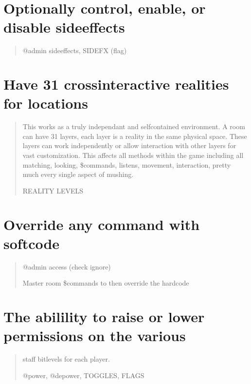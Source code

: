 \documentclass[letterpaper,10pt,english]{sphinxmanual}
\begin{document}
\section{Optionally control, enable, or disable sideeffects}
\label{\detokenize{features:optionally-control-enable-or-disable-sideeffects}}\begin{quote}

\sphinxAtStartPar
@admin sideeffects, SIDEFX (flag)
\end{quote}


\section{Have 31 cross\sphinxhyphen{}interactive realities for locations}
\label{\detokenize{features:have-31-cross-interactive-realities-for-locations}}\begin{quote}

\sphinxAtStartPar
This works as a truly independant and self\sphinxhyphen{}contained environment.
A room can have 31 \textquotesingle{}layers\textquotesingle{}, each \textquotesingle{}layer\textquotesingle{} is a reality in
the same physical space.  These layers can work independently
or allow interaction with other layers for vast customization.
This affects all methods within the game including all matching,
looking, \$commands, listens, movement, interaction, pretty
much every single aspect of mushing.

\sphinxAtStartPar
REALITY LEVELS
\end{quote}


\section{Override any command with softcode}
\label{\detokenize{features:override-any-command-with-softcode}}\begin{quote}

\sphinxAtStartPar
@admin access (check ignore)

\sphinxAtStartPar
Master room \$commands to then override the hardcode
\end{quote}


\section{The abilility to raise or lower permissions on the various}
\label{\detokenize{features:the-abilility-to-raise-or-lower-permissions-on-the-various}}\begin{quote}

\sphinxAtStartPar
staff bitlevels for each player.

\sphinxAtStartPar
@power, @depower, TOGGLES, FLAGS
\end{quote}
\end{document}
